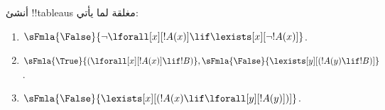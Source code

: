 \documentclass[../../../include/open-logic-section]{subfiles}
\begin{document}
\begin{prob}
أنشئ !!{tableau}s مغلقة لما يأتي:
\begin{enumerate}
\item $\sFmla{\False}{\lnot\lforall[x][!A(x)] \lif \lexists[x][\lnot!A(x)]}$.
\item $\sFmla{\True}{(\lforall[x][!A(x)] \lif !B)}, \sFmla{\False}{\lexists[y][(!A(y) \lif !B)]}$.
\item $\sFmla{\False}{\lexists[x][(!A(x) \lif \lforall[y][!A(y)])]}$.
\end{enumerate}
\end{prob}
\end{document}
